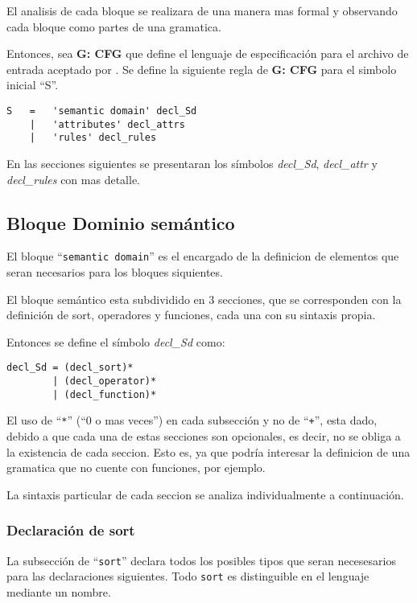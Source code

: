 El analisis de cada bloque se realizara de una manera mas formal y observando cada bloque como partes de una gramatica.

Entonces, sea \textbf{G: CFG}  que define el lenguaje de especificación para el archivo de entrada aceptado por \maggen. Se define la siguiente regla de \textbf{G: CFG} para el simbolo inicial ``S''.
\begin{center}
\lstset{language=inform}
\scriptsize
\begin{lstlisting}[frame=single]
S   =   'semantic domain' decl_Sd
    |   'attributes' decl_attrs
    |   'rules' decl_rules
\end{lstlisting}
\end{center}

En las secciones siguientes se presentaran los símbolos \textit{decl\_Sd}, \textit{decl\_attr} y \textit{decl\_rules} con mas detalle.  

\subsection{Bloque Dominio semántico}

El bloque ``\texttt{semantic domain}'' es el encargado de la definicion de elementos que seran necesarios para los bloques siquientes. 

El bloque semántico esta subdividido en 3 secciones, que se corresponden con la definición de sort, operadores y funciones, cada una con su sintaxis propia. 

Entonces se define el símbolo \textit{decl\_Sd} como:
\begin{center}
\lstset{language=inform}
\scriptsize
\begin{lstlisting}[frame=single]
decl_Sd = (decl_sort)*
        | (decl_operator)*
        | (decl_function)*
\end{lstlisting}
\end{center}
El uso de ``\texttt{*}'' (``0 o mas veces'') en cada subsección y no de ``\texttt{+}'', esta dado, debido a que cada una de estas secciones son opcionales, es decir, no se obliga a la existencia de cada seccion. Esto es, ya que podría interesar la definicion de una gramatica que no cuente con funciones, por ejemplo.

La sintaxis particular de cada seccion se analiza individualmente a continuación.

\subsubsection{Declaración de sort}
La subsección de ``\texttt{sort}'' declara todos los posibles tipos que seran necesesarios para las declaraciones siguientes. Todo \texttt{sort} es distinguible en el lenguaje mediante un nombre.

